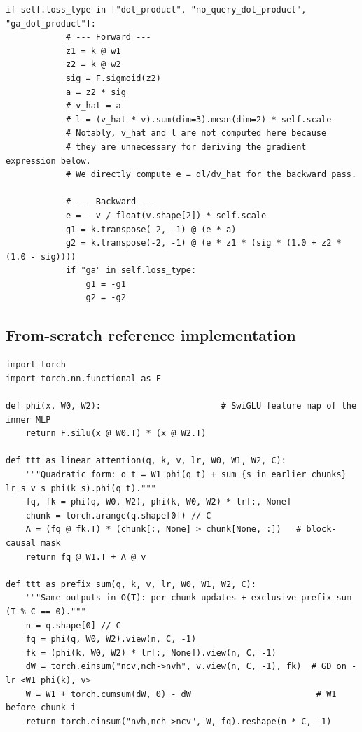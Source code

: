 \begin{lstlisting}[caption={Excerpt from \texttt{repos/\allowbreak{}JunchenLiu77\_\_ViTTT/\allowbreak{}vittt/\allowbreak{}models/\allowbreak{}ttt\_block.py} (\texttt{TTT.inner\_train\_simplified\_swiglu})},label={lst:c09-vittt}]
        if self.loss_type in ["dot_product", "no_query_dot_product", "ga_dot_product"]:
            # --- Forward ---
            z1 = k @ w1
            z2 = k @ w2
            sig = F.sigmoid(z2)
            a = z2 * sig
            # v_hat = a
            # l = (v_hat * v).sum(dim=3).mean(dim=2) * self.scale
            # Notably, v_hat and l are not computed here because
            # they are unnecessary for deriving the gradient expression below.
            # We directly compute e = dl/dv_hat for the backward pass.

            # --- Backward ---
            e = - v / float(v.shape[2]) * self.scale
            g1 = k.transpose(-2, -1) @ (e * a)
            g2 = k.transpose(-2, -1) @ (e * z1 * (sig * (1.0 + z2 * (1.0 - sig))))
            if "ga" in self.loss_type:
                g1 = -g1
                g2 = -g2
\end{lstlisting}

\subsection{From-scratch reference implementation}

\begin{lstlisting}[caption={Reference implementation (ours): a TTT layer that updates only its last linear layer with the dot-product loss, computed as linear attention.},label={lst:c09-tttla}]
import torch
import torch.nn.functional as F

def phi(x, W0, W2):                        # SwiGLU feature map of the inner MLP
    return F.silu(x @ W0.T) * (x @ W2.T)

def ttt_as_linear_attention(q, k, v, lr, W0, W1, W2, C):
    """Quadratic form: o_t = W1 phi(q_t) + sum_{s in earlier chunks} lr_s v_s phi(k_s).phi(q_t)."""
    fq, fk = phi(q, W0, W2), phi(k, W0, W2) * lr[:, None]
    chunk = torch.arange(q.shape[0]) // C
    A = (fq @ fk.T) * (chunk[:, None] > chunk[None, :])   # block-causal mask
    return fq @ W1.T + A @ v

def ttt_as_prefix_sum(q, k, v, lr, W0, W1, W2, C):
    """Same outputs in O(T): per-chunk updates + exclusive prefix sum (T % C == 0)."""
    n = q.shape[0] // C
    fq = phi(q, W0, W2).view(n, C, -1)
    fk = (phi(k, W0, W2) * lr[:, None]).view(n, C, -1)
    dW = torch.einsum("ncv,nch->nvh", v.view(n, C, -1), fk)  # GD on -lr <W1 phi(k), v>
    W = W1 + torch.cumsum(dW, 0) - dW                         # W1 before chunk i
    return torch.einsum("nvh,nch->ncv", W, fq).reshape(n * C, -1)
\end{lstlisting}

